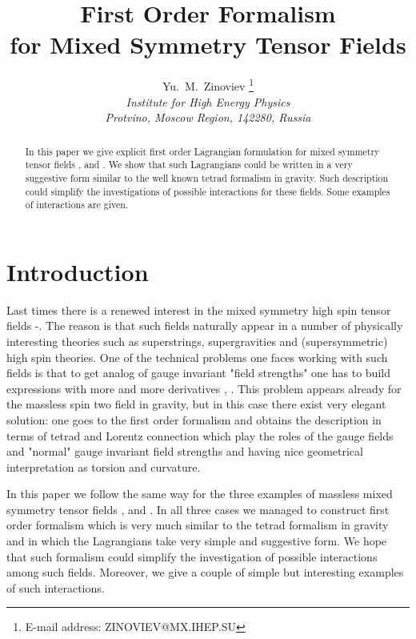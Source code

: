 \documentclass[a4paper,12pt]{article}
\author{Yu.~M.~Zinoviev
       \thanks{E-mail address: ZINOVIEV@MX.IHEP.SU} \\
        {\it Institute for High Energy Physics} \\
        {\it Protvino, Moscow Region, 142280, Russia}}
\title{First Order Formalism \\
       for Mixed Symmetry Tensor Fields }
\date{}
\begin{document}
\maketitle

\begin{abstract}
In this paper we give explicit first order Lagrangian formulation for
mixed symmetry tensor fields \myHighlight{$\Phi_{[\mu\nu],\alpha}$}\coordHE{},
\coordHE{} and \coordHE{}. We show
that such Lagrangians could be written in a very suggestive form
similar to the well known tetrad formalism in gravity. Such
description could simplify the investigations of possible interactions
for these fields. Some examples of interactions are given.
\end{abstract}

\newpage
\setcounter{page}{1}

\section*{Introduction}

Last times there is a renewed interest in the mixed symmetry high spin
tensor fields \cite{Cur86}-\cite{Zin02}. The reason is that such
fields naturally appear in a number of physically interesting theories
such as superstrings, supergravities and (supersymmetric) high spin
theories. One of the technical problems one faces working with such
fields is that to get analog of gauge invariant "field strengths" one
has to build expressions with more and more derivatives \cite{BB02},
\cite{MH02}. This problem appears already for the massless spin two
field in gravity, but in this case there exist very elegant solution:
one goes to the first order formalism and obtains the description in
terms of tetrad \coordHE{} and Lorentz connection
\myHighlight{$\omega_\mu{}^{[ab]}$}\coordHE{} which play the roles of the gauge fields and
"normal" gauge invariant field strengths \coordHE{} and
\coordHE{} having nice geometrical interpretation as
torsion and curvature.

In this paper we follow the same way for the three examples of
massless mixed symmetry tensor fields \myHighlight{$\Phi_{[\mu\nu],\alpha}$}\coordHE{},
\coordHE{} and \coordHE{}. In all
three cases we managed to construct first order formalism which is
very much similar to the tetrad formalism in gravity and in which the
Lagrangians take very simple and suggestive form. We hope that such
formalism could simplify the investigation of possible interactions
among such fields. Moreover, we give a couple of simple but
interesting examples of such interactions.
\end{document}

